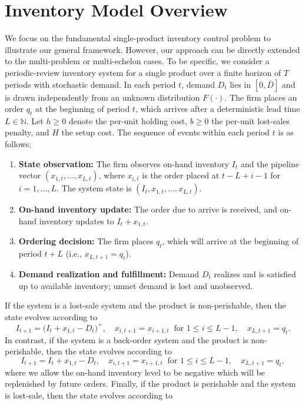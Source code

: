 \section{Inventory Model Overview}\label{sec:InventoryModel}

We focus on the fundamental single-product inventory control problem to illustrate our general framework. However, our approach can be directly extended to the multi-problem or multi-echelon cases. To be specific, we 
consider a periodic-review inventory system for a single product over a finite horizon of $T$ periods with stochastic demand. In each period $t$, demand $D_t$ lies in $[0, \bar{D}]$ and is drawn independently from an unknown distribution $F(\cdot)$. The firm places an order $q_t$ at the beginning of period $t$, which arrives after a deterministic lead time $L \in \mathds{N}$. Let $h \ge 0$ denote the per-unit holding cost, $b \ge 0$ the per-unit lost-sales penalty, and $H$ the setup cost.
The sequence of events within each period $t$ is as follows:
\begin{enumerate}
    \item \textbf{State observation:} The firm observes on-hand inventory $I_t$ and the pipeline vector $(x_{1,t}, \ldots, x_{L,t})$, where $x_{i,t}$ is the order placed at $t-L+i-1$ for $i = 1, \ldots, L$. The system state is $(I_t, x_{1,t}, \ldots, x_{L,t})$.
    \item \textbf{On-hand inventory update:} The order due to arrive is received, and on-hand inventory updates to $I_t + x_{1,t}$.
    \item \textbf{Ordering decision:} The firm places $q_t$, which will arrive at the beginning of period $t+L$ (i.e., \mbox{$x_{L,t+1} = q_t$}).
    \item \textbf{Demand realization and fulfillment:} Demand $D_t$ realizes and is satisfied up to available inventory; unmet demand is lost and unobserved.
\end{enumerate}
If the system is a lost-sale system and the product is non-perishable, then
the state evolves according to
\[
I_{t+1} = \big(I_t + x_{1,t} - D_t\big)^+, 
\quad x_{i,t+1} = x_{i+1,t} \ \text{ for } 1 \le i \le L-1, 
\quad x_{L,t+1} = q_t.
\]
In contrast, if the system is a back-order system and the product is non-perishable, then the state evolves according to 
\[
I_{t+1} = I_t + x_{1,t} - D_t, 
\quad x_{i,t+1} = x_{i+1,t} \ \text{ for } 1 \le i \le L-1, 
\quad x_{L,t+1} = q_t,
\]
where we allow the on-hand inventory level to be negative which will be replenished by future orders. Finally, if the product is perishable and the system is lost-sale, then the state evolves according to
